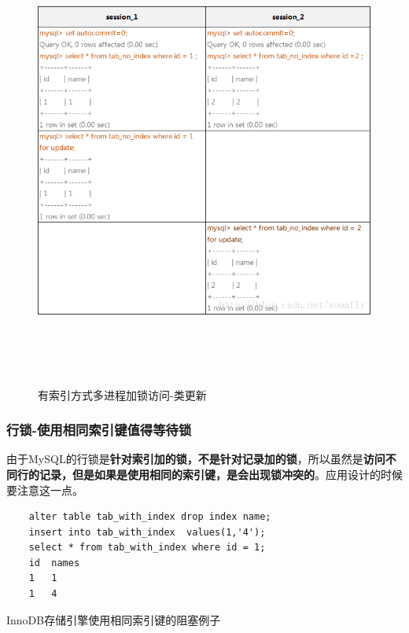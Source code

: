 \documentclass[UTF8,a4paper,12pt]{ctexbook}
\begin{document}
				\begin{figure}[H]
					\centering
					\includegraphics[width=13cm, height=15cm]{lock-row}
					\caption{有索引方式多进程加锁访问-类更新}
				\end{figure}
			
			
			\subsubsection{行锁-使用相同索引键值得等待锁}
				由于MySQL的行锁是\textbf{针对索引加的锁，不是针对记录加的锁}，所以虽然是\textbf{访问不同行的记录，但是如果是使用相同的索引键，是会出现锁冲突的}。应用设计的时候要注意这一点。
			
				\begin{lstlisting}
	alter table tab_with_index drop index name;
	insert into tab_with_index  values(1,'4');	
	select * from tab_with_index where id = 1;
	id  names
	1 	1
	1	4		
				\end{lstlisting}
				
				InnoDB存储引擎使用相同索引键的阻塞例子
				
\end{document}
